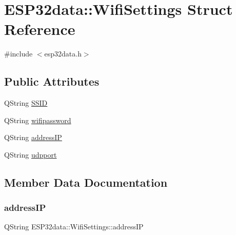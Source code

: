 \hypertarget{struct_e_s_p32data_1_1_wifi_settings}{}\section{E\+S\+P32data\+:\+:Wifi\+Settings Struct Reference}
\label{struct_e_s_p32data_1_1_wifi_settings}


{\ttfamily \#include $<$esp32data.\+h$>$}

\subsection*{Public Attributes}
\begin{DoxyCompactItemize}
\item 
Q\+String \hyperlink{struct_e_s_p32data_1_1_wifi_settings_a59bf3c31c55bea4fa07d0e3d55d5c125}{S\+S\+ID}
\item 
Q\+String \hyperlink{struct_e_s_p32data_1_1_wifi_settings_a38dce639f92290ff219e29d822b4b62c}{wifipassword}
\item 
Q\+String \hyperlink{struct_e_s_p32data_1_1_wifi_settings_acd8a6d52beba9019fba2f7055dee7072}{address\+IP}
\item 
Q\+String \hyperlink{struct_e_s_p32data_1_1_wifi_settings_a32dc462ab6495a371a9916689f6c5bbb}{udpport}
\end{DoxyCompactItemize}


\subsection{Member Data Documentation}
\mbox{\label{struct_e_s_p32data_1_1_wifi_settings_acd8a6d52beba9019fba2f7055dee7072}} 
\subsubsection{\texorpdfstring{address\+IP}{addressIP}}
{\footnotesize\ttfamily Q\+String E\+S\+P32data\+::\+Wifi\+Settings\+::address\+IP}

\mbox{\label{struct_e_s_p32data_1_1_wifi_settings_a59bf3c31c55bea4fa07d0e3d55d5c125}} 
